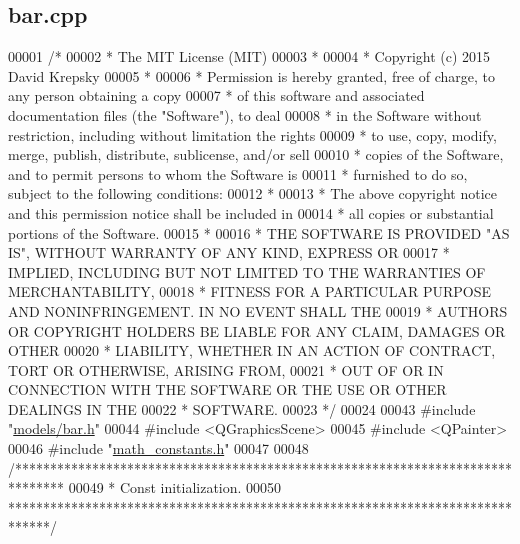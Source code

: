 \hypertarget{bar_8cpp_source}{}\subsection{bar.\+cpp}
\label{bar_8cpp_source}

\begin{DoxyCode}
00001 \textcolor{comment}{/*}
00002 \textcolor{comment}{ * The MIT License (MIT)}
00003 \textcolor{comment}{ *}
00004 \textcolor{comment}{ * Copyright (c) 2015 David Krepsky}
00005 \textcolor{comment}{ *}
00006 \textcolor{comment}{ * Permission is hereby granted, free of charge, to any person obtaining a copy}
00007 \textcolor{comment}{ * of this software and associated documentation files (the "Software"), to deal}
00008 \textcolor{comment}{ * in the Software without restriction, including without limitation the rights}
00009 \textcolor{comment}{ * to use, copy, modify, merge, publish, distribute, sublicense, and/or sell}
00010 \textcolor{comment}{ * copies of the Software, and to permit persons to whom the Software is}
00011 \textcolor{comment}{ * furnished to do so, subject to the following conditions:}
00012 \textcolor{comment}{ *}
00013 \textcolor{comment}{ * The above copyright notice and this permission notice shall be included in}
00014 \textcolor{comment}{ * all copies or substantial portions of the Software.}
00015 \textcolor{comment}{ *}
00016 \textcolor{comment}{ * THE SOFTWARE IS PROVIDED "AS IS", WITHOUT WARRANTY OF ANY KIND, EXPRESS OR}
00017 \textcolor{comment}{ * IMPLIED, INCLUDING BUT NOT LIMITED TO THE WARRANTIES OF MERCHANTABILITY,}
00018 \textcolor{comment}{ * FITNESS FOR A PARTICULAR PURPOSE AND NONINFRINGEMENT. IN NO EVENT SHALL THE}
00019 \textcolor{comment}{ * AUTHORS OR COPYRIGHT HOLDERS BE LIABLE FOR ANY CLAIM, DAMAGES OR OTHER}
00020 \textcolor{comment}{ * LIABILITY, WHETHER IN AN ACTION OF CONTRACT, TORT OR OTHERWISE, ARISING FROM,}
00021 \textcolor{comment}{ * OUT OF OR IN CONNECTION WITH THE SOFTWARE OR THE USE OR OTHER DEALINGS IN THE}
00022 \textcolor{comment}{ * SOFTWARE.}
00023 \textcolor{comment}{ */}
00024 
00043 \textcolor{preprocessor}{#include "\hyperlink{bar_8h}{models/bar.h}"}
00044 \textcolor{preprocessor}{#include <QGraphicsScene>}
00045 \textcolor{preprocessor}{#include <QPainter>}
00046 \textcolor{preprocessor}{#include "\hyperlink{math__constants_8h}{math\_constants.h}"}
00047 
00048 \textcolor{comment}{/*******************************************************************************}
00049 \textcolor{comment}{ * Const initialization.}
00050 \textcolor{comment}{ ******************************************************************************/}

\end{DoxyCode}
